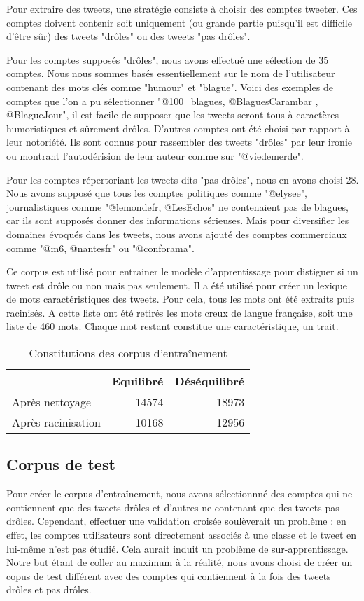 \documentclass[10pt,a4paper,twoside]{article}
\begin{document}
Pour extraire des tweets, une stratégie consiste à choisir des comptes tweeter. Ces comptes doivent contenir soit uniquement (ou grande partie puisqu'il est difficile d'être sûr) des tweets "drôles" ou des tweets "pas drôles".

Pour les comptes supposés "drôles", nous avons effectué une sélection de 35 comptes. Nous nous sommes basés essentiellement sur le nom de l'utilisateur contenant des mots clés comme "humour" et "blague". Voici des exemples de comptes que l'on a pu sélectionner "@100\_blagues, @BlaguesCarambar , @BlagueJour", il est facile de supposer que les tweets seront tous à caractères humoristiques et sûrement drôles. D'autres comptes ont été choisi par rapport à leur notoriété. Ils sont connus pour rassembler des tweets "drôles" par leur ironie ou montrant l'autodérision de leur auteur comme sur "@viedemerde".

Pour les comptes répertoriant les tweets dits "pas drôles", nous en avons choisi 28. Nous avons supposé que tous les comptes politiques comme "@elysee", journalistiques comme "@lemondefr, @LesEchos" ne contenaient pas de blagues, car ils sont supposés donner des informations sérieuses. Mais pour diversifier les domaines évoqués dans les tweets, nous avons ajouté des comptes commerciaux comme "@m6, @nantesfr" ou "@conforama".

Ce corpus est utilisé pour entrainer le modèle d'apprentissage pour distiguer si un tweet est drôle ou non mais pas seulement. Il a été utilisé pour créer un lexique de mots caractéristiques des tweets. Pour cela, tous les mots ont été extraits puis racinisés. A cette liste ont été retirés les mots creux de langue française, soit une liste de 460 mots. Chaque mot restant constitue une caractéristique, un trait.



\begin{table}[!h]
\centering
	\begin{tabular}{lrr}
	\toprule
	& Equilibré & Déséquilibré \\
	\midrule
	 Après nettoyage & 14574 & 18973 \\
	 Après racinisation & 10168 & 12956 \\
	\bottomrule
	\end{tabular}
\caption{Constitutions des corpus d'entraînement}
\end{table}

\subsection{Corpus de test}
Pour créer le corpus d'entraînement, nous avons sélectionnné des comptes qui ne contiennent que des tweets drôles et d'autres ne contenant que des tweets pas drôles. Cependant, effectuer une validation croisée soulèverait un problème : en effet, les comptes utilisateurs sont directement associés à une classe et le tweet en lui-même n'est pas étudié. Cela aurait induit un problème de sur-apprentissage. Notre but étant de coller au maximum à la réalité, nous avons choisi de créer un copus de test différent avec des comptes qui contiennent à la fois des tweets drôles et pas drôles. 
\end{document}
